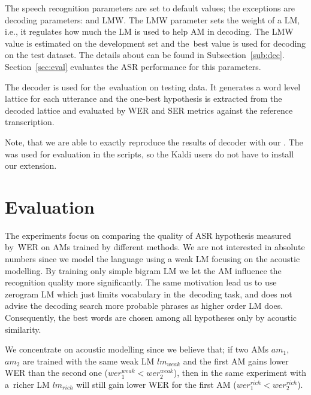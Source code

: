 The speech recognition parameters are set to default values; the exceptions are decoding parameters:  and \acl{LMW}. 
The \ac{LMW} parameter sets the weight of a \ac{LM}, i.e., it regulates how much the \ac{LM} is used to help \ac{AM} in decoding. 
The \ac{LMW} value is estimated on the development set and the~best value is used for decoding on the test dataset.
The details about  can be found in Subsection~\ref{sub:dec}.
Section~\ref{sec:eval} evaluates the \ac{ASR} performance for this parameters.

The  decoder is used for the~evaluation on testing data.
It generates a word level lattice for each utterance and the one-best hypothesis is extracted from the decoded lattice and evaluated by \ac{WER} and \ac{SER} metrics against the reference transcription.

Note, that we are able to exactly reproduce the results of  decoder with our .
The  was used for evaluation in the scripts, so the Kaldi users do not have to install our extension.

\section{Evaluation}
\label{sec:am_eval}

The experiments focus on comparing the quality of ASR hypothesis measured by~\ac{WER} on \acp{AM} trained by different methods.
We are not interested in absolute numbers since we model the language using a weak \ac{LM} focusing on the acoustic modelling.
By training only simple bigram \ac{LM} we let the \ac{AM} influence the recognition quality more significantly. 
The same motivation lead us to use zerogram \ac{LM} which just limits vocabulary in the~decoding task, and does not advise the decoding search more probable phrases as higher order \ac{LM} does.
Consequently, the best words are chosen among all hypotheses only by acoustic similarity.

We concentrate on acoustic modelling since we believe that; if two \acp{AM} $am_1$, $am_2$ are trained with the same weak \acl{LM} $lm_{weak}$ and the first \ac{AM} gains lower \ac{WER} than the second one ($wer^{weak}_{1} <  wer^{weak}_{2}$), then in the same experiment with a~richer \ac{LM} $lm_{rich}$ will still gain lower \ac{WER} for the first \ac{AM} ($wer^{rich}_{1} <  wer^{rich}_{2}$).

